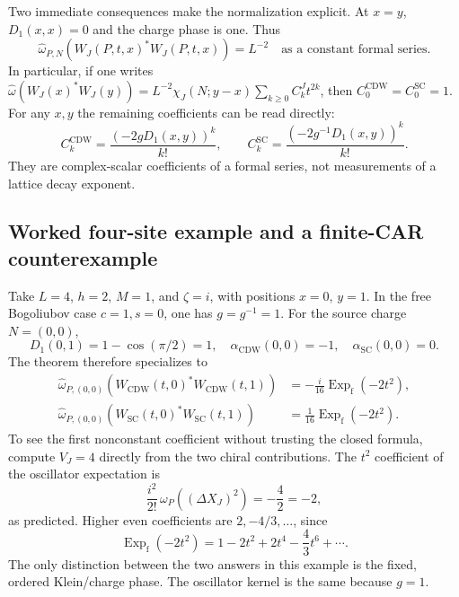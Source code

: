 Two immediate consequences make the normalization explicit.
At \(x=y\), \(D_1(x,x)=0\) and the charge phase is one.  Thus
\begin{equation}
 \widehat\omega_{P,N}(W_J(P,t,x)^*W_J(P,t,x))=L^{-2}
 \quad\text{as a constant formal series.}
 \label{eq:ch20b-coincident}
\end{equation}
In particular, if one writes
\(\widehat\omega(W_J(x)^*W_J(y))=
  L^{-2}\chi_J(N;y-x)\sum_{k\geq0}C_k^Jt^{2k}\),
then \(C_0^{\mathrm{CDW}}=C_0^{\mathrm{SC}}=1\).  For any \(x,y\)
the remaining coefficients can be read directly:
\begin{equation}
 C_k^{\mathrm{CDW}}=\frac{(-2gD_1(x,y))^k}{k!},\qquad
 C_k^{\mathrm{SC}}=\frac{(-2g^{-1}D_1(x,y))^k}{k!}.
 \label{eq:ch20b-coefficients}
\end{equation}
They are complex-scalar coefficients of a formal series, not
measurements of a lattice decay exponent.

\subsection{Worked four-site example and a finite-CAR counterexample}
\label{subsec:ch20b-example}

Take \(L=4\), \(h=2\), \(M=1\), and
\(\zeta=i\), with positions \(x=0\), \(y=1\).
In the free Bogoliubov case \(c=1,s=0\), one has \(g=g^{-1}=1\).
For the source charge \(N=(0,0)\),
\[
 D_1(0,1)=1-\cos(\pi/2)=1,
 \quad\alpha_{\mathrm{CDW}}(0,0)=-1,
 \quad\alpha_{\mathrm{SC}}(0,0)=0.
\]
The theorem therefore specializes to
\begin{align}
 \widehat\omega_{P,(0,0)}(W_{\mathrm{CDW}}(t,0)^*
                                  W_{\mathrm{CDW}}(t,1))
 &=-\frac{i}{16}\operatorname{Exp}_{\mathrm f}(-2t^2),
 \label{eq:ch20b-example-cdw}\\
 \widehat\omega_{P,(0,0)}(W_{\mathrm{SC}}(t,0)^*
                                  W_{\mathrm{SC}}(t,1))
 &=\frac1{16}\operatorname{Exp}_{\mathrm f}(-2t^2).
 \label{eq:ch20b-example-sc}
\end{align}
To see the first nonconstant coefficient without trusting the closed
formula, compute \(V_J=4\) directly from the two chiral contributions.
The \(t^2\) coefficient of the oscillator expectation is
\[
 \frac{i^2}{2!}\,\omega_P((\Delta X_J)^2)
 =-\frac42=-2,
\]
as predicted.  Higher even coefficients are
\(2,-4/3,\ldots\), since
\begin{equation}
 \operatorname{Exp}_{\mathrm f}(-2t^2)
 =1-2t^2+2t^4-\frac43t^6+\cdots.
 \label{eq:ch20b-example-series}
\end{equation}
The only distinction between the two answers in this example is the
fixed, ordered Klein/charge phase.  The oscillator kernel is the same
because \(g=1\).

